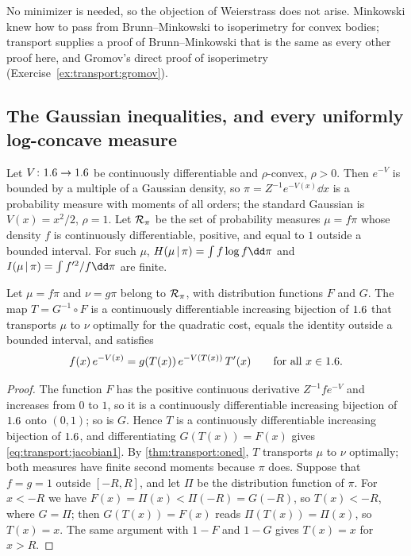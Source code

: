 \begin{refsection}
No minimizer is needed, so the objection of Weierstrass does not arise. Minkowski knew how to pass from Brunn--Minkowski to isoperimetry for convex bodies; transport supplies a proof of Brunn--Minkowski that is the same as every other proof here, and Gromov's direct proof of isoperimetry (Exercise~\ref{ex:transport:gromov}).

\subsection{The Gaussian inequalities, and every uniformly log-concave measure}\label{sec:transport:gaussafter}

Let $V\colon1.6\to1.6$ be continuously differentiable and $\rho$-convex, $\rho>0$. Then $e^{-V}$ is bounded by a multiple of a Gaussian density, so $\pi=Z^{-1}e^{-V(x)}\dd x$ is a probability measure with moments of all orders; the standard Gaussian is $V(x)=x^2/2$, $\rho=1$. Let $\mathcal{R}_\pi$ be the set of probability measures $\mu=f\pi$ whose density $f$ is continuously differentiable, positive, and equal to $1$ outside a bounded interval. For such $\mu$, $\transportH{\mu}{\pi}=\int f\log f\dd\pi$ and $\transportI{\mu}{\pi}=\int f'^2/f\dd\pi$ are finite.

\begin{lemma}\label{lem:transport:monotone}
Let $\mu=f\pi$ and $\nu=g\pi$ belong to $\mathcal{R}_\pi$, with distribution functions $F$ and $G$. The map $T=G^{-1}\circ F$ is a continuously differentiable increasing bijection of $1.6$ that transports $\mu$ to $\nu$ optimally for the quadratic cost, equals the identity outside a bounded interval, and satisfies
\begin{equation}\label{eq:transport:jacobian1}
f(x)\,e^{-V(x)}=g(T(x))\,e^{-V(T(x))}\,T'(x)\qquad\text{for all }x\in1.6.
\end{equation}
\end{lemma}

\begin{proof}
The function $F$ has the positive continuous derivative $Z^{-1}fe^{-V}$ and increases from $0$ to $1$, so it is a continuously differentiable increasing bijection of $1.6$ onto $(0,1)$; so is $G$. Hence $T$ is a continuously differentiable increasing bijection of $1.6$, and differentiating $G(T(x))=F(x)$ gives \eqref{eq:transport:jacobian1}. By \cref{thm:transport:oned}, $T$ transports $\mu$ to $\nu$ optimally; both measures have finite second moments because $\pi$ does. Suppose that $f=g=1$ outside $[-R,R]$, and let $\Pi$ be the distribution function of $\pi$. For $x<-R$ we have $F(x)=\Pi(x)<\Pi(-R)=G(-R)$, so $T(x)<-R$, where $G=\Pi$; then $G(T(x))=F(x)$ reads $\Pi(T(x))=\Pi(x)$, so $T(x)=x$. The same argument with $1-F$ and $1-G$ gives $T(x)=x$ for $x>R$.
\end{proof}


\end{refsection}
